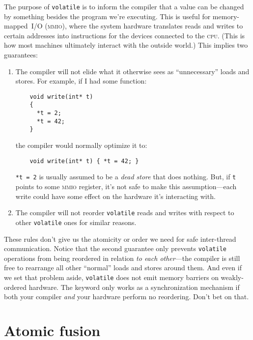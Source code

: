 \documentclass[fontsize=\bodyfontsize, numbers=endperiod]{scrartcl}
\newcommand{\codesize}{\fontsize{\bodyfontsize}{\bodybaselineskip}}
\newcommand{\monobox}[1]{\mbox{\texttt{#1}}}
\newcommand{\keyword}[1]{\monobox{\color{darkGreen}#1}}
\newcommand{\introduce}[1]{\textit{#1}}
\newenvironment{colfigure}
  {\par\vspace{1\baselineskip minus 0.5\baselineskip}\noindent\minipage{\linewidth}}
  {\endminipage\vspace{1\baselineskip minus 0.7\baselineskip}}
\begin{document}
\begin{multicols}{2}
The purpose of \keyword{volatile} is to inform the compiler that a value can
be changed by something besides the program we're executing.
This is useful for memory-mapped~\textsc{I/O} \textsc{(mmio)},
where the system hardware translates reads and writes to certain addresses
into instructions for the devices connected to the \textsc{cpu}.
(This is how most machines ultimately interact with the outside world.)
This implies two guarantees:
\begin{enumerate}
\item The compiler will not elide what it otherwise sees as ``unnecessary''
    loads and stores. For example, if I had some function:
    \begin{colfigure}
    \begin{verbatim}
    void write(int* t)
    {
      *t = 2;
      *t = 42;
    }
    \end{verbatim}
    \end{colfigure}
    the compiler would normally optimize it to:
    \begin{verbatim}
    void write(int* t) { *t = 42; }
    \end{verbatim}
    \texttt{*t = 2} is usually assumed to be a
    \introduce{dead store} that does nothing.
    But, if \texttt{t} points to some \textsc{mmio} register, it's not
    safe to make this assumption---each write could have some effect
    on the hardware it's interacting with.

\item The compiler will not reorder \keyword{volatile}
    reads and writes with respect to other \keyword{volatile} ones
    for similar reasons.
\end{enumerate}

These rules don't give us the atomicity or order we need for safe
inter-thread communication.
Notice that the second guarantee only prevents \keyword{volatile} operations
from being reordered in relation \emph{to each other}---the compiler is still
free to rearrange all other ``normal'' loads and stores around them.
And even if we set that problem aside,
\keyword{volatile} does not emit memory barriers on weakly-ordered hardware.
The keyword only works as a synchronization mechanism if both your compiler
\emph{and} your hardware perform no reordering.
Don't bet on that.

\section{Atomic fusion}
\label{fusing}


\end{multicols}
\end{document}
